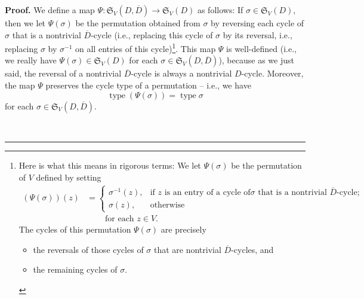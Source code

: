 \documentclass[numbers=enddot,12pt,final,onecolumn,notitlepage]{scrartcl}%
\numberwithin{exer}{section}
\theoremstyle{definition}
\newenvironment{proof}[1][Proof]{\noindent\textbf{#1.} }{\ \rule{0.5em}{0.5em}}
\begin{document}
\begin{proof}
We define a map $\Psi:\mathfrak{S}_{V}\left(  D,\overline{D}\right)
\rightarrow\mathfrak{S}_{V}\left(  D\right)  $ as follows: If $\sigma
\in\mathfrak{S}_{V}\left(  D\right)  $, then we let $\Psi\left(
\sigma\right)  $ be the permutation obtained from $\sigma$ by reversing each
cycle of $\sigma$ that is a nontrivial $\overline{D}$-cycle (i.e., replacing
this cycle of $\sigma$ by its reversal, i.e., replacing $\sigma$ by
$\sigma^{-1}$ on all entries of this cycle)\footnote{Here is what this means
in rigorous terms: We let $\Psi\left(  \sigma\right)  $ be the permutation of
$V$ defined by setting%
\begin{align*}
\left(  \Psi\left(  \sigma\right)  \right)  \left(  z\right)   &  =%
\begin{cases}
\sigma^{-1}\left(  z\right)  , & \text{if }z\text{ is an entry of a cycle of
}\sigma\text{ that is a nontrivial }\overline{D}\text{-cycle};\\
\sigma\left(  z\right)  , & \text{otherwise}%
\end{cases}
\\
&  \ \ \ \ \ \ \ \ \ \ \text{for each }z\in V.
\end{align*}
The cycles of this permutation $\Psi\left(  \sigma\right)  $ are precisely
\par
\begin{itemize}
\item the reversals of those cycles of $\sigma$ that are nontrivial
$\overline{D}$-cycles, and
\par
\item the remaining cycles of $\sigma$.
\end{itemize}
}. This map $\Psi$ is well-defined (i.e., we really have $\Psi\left(
\sigma\right)  \in\mathfrak{S}_{V}\left(  D\right)  $ for each $\sigma
\in\mathfrak{S}_{V}\left(  D,\overline{D}\right)  $), because as we just said,
the reversal of a nontrivial $\overline{D}$-cycle is always a nontrivial
$D$-cycle. Moreover, the map $\Psi$ preserves the cycle type of a permutation
-- i.e., we have%
\begin{equation}
\operatorname*{type}\left(  \Psi\left(  \sigma\right)  \right)
=\operatorname*{type}\sigma\label{pf.thm.UX.2.types}%
\end{equation}
for each $\sigma\in\mathfrak{S}_{V}\left(  D,\overline{D}\right)  $.


\end{proof}
\end{document}
